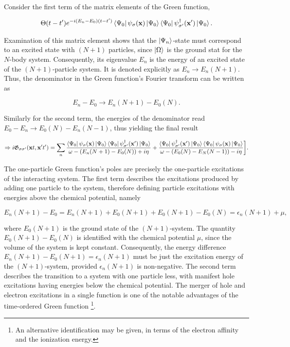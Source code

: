 \documentclass{homework}
\begin{document}
Consider the first term of the matrix elements of the Green function, 

$$
\Theta(t-t') e^{-i(E_n - E_0)(t-t')} \bra{\Psi_0} \psi_{\sigma}({\bf x}) \ket{\Psi_0} \bra{\Psi_0} \psi_{\sigma'}^\dagger({\bf x}') \ket{\Psi_0}.
$$

Examination of this matrix element shows that the $\ket{\Psi_n}$-state must correspond to an excited state with $(N+1)$ particles, since $\ket{\Omega}$ is the ground stat for the $N$-body system. Consequently, its eigenvalue $E_n$ is the energy of an excited state of the $(N+1)$-particle system. It is denoted explicitly as $E_n \rightarrow E_{n}(N+1)$. Thus, the denominator in the Green function's Fourier transform can be written as 

$$
    E_n - E_0 \rightarrow E_n(N+1) - E_0(N).
$$

Similarly for the second term, the energies of the denominator read $E_0 - E_n \rightarrow E_0(N) - E_n(N-1)$, thus yielding the final result 

\begin{equation}
    \Rightarrow i \mathfrak{G}_{\sigma \sigma'} ({\bf x}t, {\bf x}'t') = \sum_{n}
             \frac{\bra{\Psi_0} \psi_{\sigma}({\bf x}) \ket{\Psi_0} \bra{\Psi_0} \psi_{\sigma'}^\dagger({\bf x}') \ket{\Psi_0}}{\omega - (E_n(N+1)-E_0(N)) + i\eta} + \frac{\bra{\Psi_0} \psi_{\sigma'}^\dagger({\bf x}')\ket{\Psi_0} \bra{\Psi_0} \psi_{\sigma}({\bf x}) \ket{\Psi_0}}{\omega - (E_0(N)-E_N(N-1)) - i\eta}\bigg].
\end{equation}

The one-particle Green function's poles are precisely the one-particle excitations of the interacting system. The first term describes the excitations produced by adding one particle to the system, therefore defining particle excitations with energies above the chemical potential, namely 

$$
E_n (N+1) - E_0 = E_n (N+1) + E_0(N+1) + E_0(N+1) - E_0(N) = \epsilon_n (N+1) + \mu,
$$

where $E_0(N+1)$ is the ground state of the $(N+1)$-system. The quantity $E_0(N+1) - E_0(N)$ is identified with the chemical potential $\mu$, since the volume of the system is kept constant. Consequently, the energy difference $E_n(N+1) - E_0(N+1) = \epsilon_n (N+1)$ must be just the excitation energy of the $(N+1)$-system, provided $\epsilon_n (N+1)$ is non-negative. The second term describes the transition to a system with one particle less, with manifest hole excitations having energies below the chemical potential. The merger of hole and electron excitations in a single function is one of the notable advantages of the time-ordered Green function \footnote{An alternative identification may be given, in terms of the electron affinity and the ionization energy.}. \\
\end{document}
